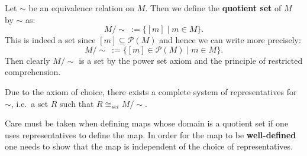 \documentclass[root.tex]{subfiles}
\begin{document}
\begin{mydef}
Let $\sim$ be an equivalence relation on $M$. Then we define the \textbf{quotient set} of $M$ by $\sim$ as:
$$
M/\!\sim\ := \{[m]\mid m \in M\}.
$$
This is indeed a set since $[m]\subseteq\mathcal{P}(M)$ and hence we can write more precisely:
$$
M/\!\sim\ := \{[m]\in\mathcal{P}(M)\mid m \in M\}.
$$
Then clearly $M/\!\sim$ is a set by the power set axiom and the principle of restricted comprehension.
\end{mydef}

\begin{remark}
Due to the axiom of choice, there exists a complete system of representatives for $\sim$, i.e.\ a set $R$ such that $R \cong_{set} M/\!\sim$.
\end{remark}

\begin{remark}
Care must be taken when defining maps whose domain is a quotient set if one uses representatives to define the map. In order for the map to be \textbf{well-defined} one needs to show that the map is independent of the choice of representatives. 
\end{remark}



\end{document}
